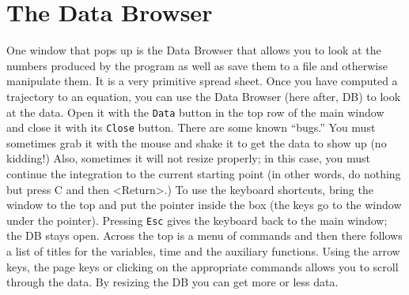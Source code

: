 \documentclass{article}
\begin{document}
\section{The Data Browser}
One window that pops up is the Data Browser that allows you to look at
the numbers produced by the program as well as save them to a file and
otherwise manipulate them.  It is a very primitive spread sheet.  Once
you have computed a trajectory to an equation, you can use the Data
Browser (here after, DB) to look at the data.  Open it with the {\tt Data} button
in the top row of the main window and close it with its {\tt Close} button.  There are some known
``bugs.'' You must sometimes grab it with the mouse and shake it to
get the data to show up (no kidding!) Also, sometimes it will not
resize properly; in this case, you must continue the integration to
the current starting point (in other words, do nothing but press C and
then <Return>.) To use the keyboard shortcuts, bring the window to the top and
put the pointer inside the box (the keys go to the window under the pointer).  Pressing {\tt Esc}
gives the keyboard back to the main window; the DB stays open.  Across the top is a menu of commands
and then there follows a list of titles for the variables, time and
the auxiliary functions. Using the arrow keys, the page keys or
clicking on the appropriate commands allows you to scroll through the
data. By resizing the DB you can get more or less data.
\end{document}
